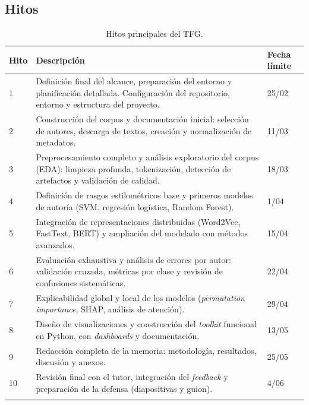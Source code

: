 \documentclass[IB]{TFUOC}%
\begin{document}
\subsection{Hitos}
\begin{longtable}{|p{1cm}|p{10.5cm}|p{2.5cm}|}
\hline
\textbf{Hito} & \textbf{Descripción} & \textbf{Fecha límite} \\
\hline

1 & Definición final del alcance, preparación del entorno y planificación detallada. Configuración del repositorio, entorno y estructura del proyecto.
& 25/02 \\
\hline

2 & Construcción del corpus y documentación inicial: selección de autores, descarga de textos, creación y normalización de metadatos.
& 11/03 \\
\hline

3 & Preprocesamiento completo y análisis exploratorio del corpus (EDA): limpieza profunda, tokenización, detección de artefactos y validación de calidad.
& 18/03 \\
\hline

4 & Definición de rasgos estilométricos base y primeros modelos de autoría (SVM, regresión logística, Random Forest).
& 1/04 \\
\hline

5 & Integración de representaciones distribuidas (Word2Vec, FastText, BERT) y ampliación del modelado con métodos avanzados.
& 15/04 \\
\hline

6 & Evaluación exhaustiva y análisis de errores por autor: validación cruzada, métricas por clase y revisión de confusiones sistemáticas.
& 22/04 \\
\hline

7 & Explicabilidad global y local de los modelos (\textit{permutation importance}, SHAP, análisis de atención).
& 29/04 \\
\hline

8 & Diseño de visualizaciones y construcción del \textit{toolkit} funcional en Python, con \textit{dashboards} y documentación.
& 13/05 \\
\hline

9 & Redacción completa de la memoria: metodología, resultados, discusión y anexos.
& 25/05 \\
\hline

10 & Revisión final con el tutor, integración del \textit{feedback} y preparación de la defensa (diapositivas y guion).
& 4/06 \\
\hline
\caption{Hitos principales del TFG.}\label{tab:hitos_tfg}\\
\end{longtable}
\end{document}
